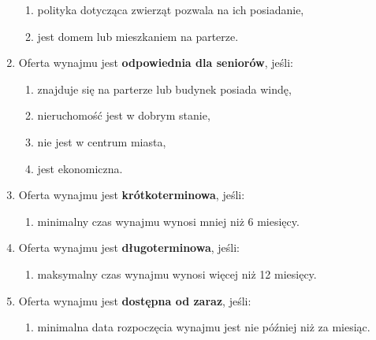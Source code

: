 \begin{enumerate}[label=W\arabic*.]
    \begin{enumerate}[label=\arabic*.]
        \item polityka dotycząca zwierząt pozwala na ich posiadanie,
        \item jest domem lub mieszkaniem na parterze.
    \end{enumerate}
    \item Oferta wynajmu jest \textbf{odpowiednia dla seniorów}, jeśli:
    \begin{enumerate}[label=\arabic*.]
        \item znajduje się na parterze lub budynek posiada windę,
        \item nieruchomość jest w dobrym stanie,
        \item nie jest w centrum miasta,
        \item jest ekonomiczna.
    \end{enumerate}
    \item Oferta wynajmu jest \textbf{krótkoterminowa}, jeśli:
    \begin{enumerate}[label=\arabic*.]
        \item minimalny czas wynajmu wynosi mniej niż 6 miesięcy.
    \end{enumerate}
    \item Oferta wynajmu jest \textbf{długoterminowa}, jeśli:
    \begin{enumerate}[label=\arabic*.]
        \item maksymalny czas wynajmu wynosi więcej niż 12 miesięcy.
    \end{enumerate}
    \item Oferta wynajmu jest \textbf{dostępna od zaraz}, jeśli:
    \begin{enumerate}[label=\arabic*.]
        \item minimalna data rozpoczęcia wynajmu jest nie później niż za miesiąc.
    \end{enumerate}
\end{enumerate}